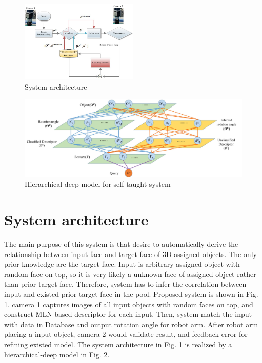 \documentclass[journal]{IEEEtran}
\begin{document}
\begin{figure}[!t]
\begin{center}
\includegraphics[width=0.5\textwidth]{j_img/fig1.jpg}
\caption{System architecture}\label{test}
\end{center}
\end{figure}

\begin{figure}[!t]
\begin{center}
\includegraphics*[width=7 in]{j_img/fig3.jpg}
\caption{Hierarchical-deep model for self-taught system}\label{test}
\end{center}
\end{figure}


\section{System architecture} 

The main purpose of this system is that desire to automatically derive the relationship between input face and target face of 3D assigned objects. The only prior knowledge are the target face. Input is arbitrary assigned object with random face on top, so it is very likely a unknown face of assigned object rather than prior target face. Therefore, system has to infer the correlation between input and existed prior target face in the pool.  Proposed system is shown in Fig. 1. camera 1 captures images of all input objects with random faces on top, and construct MLN-based descriptor for each input. Then, system match the input with data in Database and output rotation angle for robot arm. After robot arm placing a input object, camera 2 would validate result, and feedback error for refining existed model. The system architecture in Fig. 1 is realized by a hierarchical-deep model in Fig. 2. 
\end{document}

